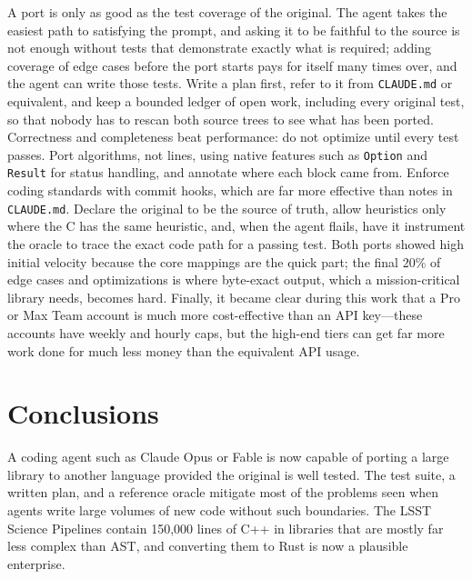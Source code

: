 A port is only as good as the test coverage of the original.
The agent takes the easiest path to satisfying the prompt, and asking it to be faithful to the source is not enough without tests that demonstrate exactly what is required; adding coverage of edge cases before the port starts pays for itself many times over, and the agent can write those tests.
Write a plan first, refer to it from \texttt{CLAUDE.md} or equivalent, and keep a bounded ledger of open work, including every original test, so that nobody has to rescan both source trees to see what has been ported.
Correctness and completeness beat performance: do not optimize until every test passes.
Port algorithms, not lines, using native features such as \texttt{Option} and \texttt{Result} for status handling, and annotate where each block came from.
Enforce coding standards with commit hooks, which are far more effective than notes in \texttt{CLAUDE.md}.
Declare the original to be the source of truth, allow heuristics only where the C has the same heuristic, and, when the agent flails, have it instrument the oracle to trace the exact code path for a passing test.
Both ports showed high initial velocity because the core mappings are the quick part; the final 20\% of edge cases and optimizations is where byte-exact output, which a mission-critical library needs, becomes hard.
Finally, it became clear during this work that a Pro or Max Team account is much more cost-effective than an API key---these accounts have weekly and hourly caps, but the high-end tiers can get far more work done for much less money than the equivalent API usage.

\section{Conclusions}

A coding agent such as Claude Opus or Fable is now capable of porting a large library to another language provided the original is well tested.
The test suite, a written plan, and a reference oracle mitigate most of the problems seen when agents write large volumes of new code without such boundaries.
The LSST Science Pipelines contain 150,000 lines of C++ in libraries that are mostly far less complex than AST, and converting them to Rust is now a plausible enterprise.
